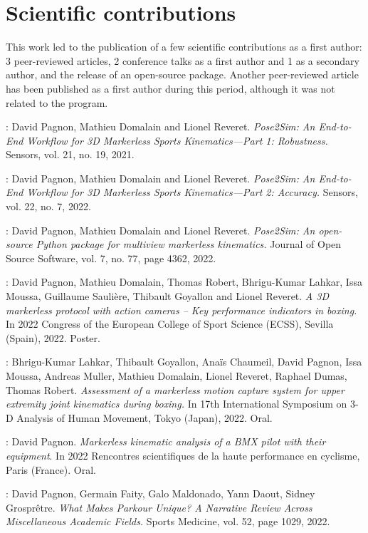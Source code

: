 \newpage
\section*{Scientific contributions}

This work led to the publication of a few scientific contributions as a first author: 3 peer-reviewed articles, 2 conference talks as a first author and 1 as a secondary author, and the release of an open-source package.
Another peer-reviewed article has been published as a first author during this period, although it was not related to the program.

\noindent\cite{Pagnon2021}: David Pagnon, Mathieu Domalain and Lionel Reveret. \textit{Pose2Sim: An
End-to-End Workflow for 3D Markerless Sports Kinematics—Part 1:
Robustness.} Sensors, vol. 21, no. 19, 2021.

\noindent\cite{Pagnon2022a}: David Pagnon, Mathieu Domalain and Lionel Reveret. \textit{Pose2Sim: An
End-to-End Workflow for 3D Markerless Sports Kinematics—Part 2:
Accuracy.} Sensors, vol. 22, no. 7, 2022.

\noindent\cite{Pagnon2022b}: David Pagnon, Mathieu Domalain and Lionel Reveret. \textit{Pose2Sim:
An open-source Python package for multiview markerless kinematics.}
Journal of Open Source Software, vol. 7, no. 77, page 4362, 2022.

\noindent\cite{Pagnon2022c}: 
David Pagnon, Mathieu Domalain, Thomas Robert, Bhrigu-Kumar Lahkar, Issa Moussa, Guillaume Saulière, Thibault Goyallon and Lionel Reveret. \textit{A 3D markerless protocol with action cameras – Key performance indicators in boxing.} In 2022 Congress of the European College of Sport Science (ECSS), Sevilla (Spain), 2022. Poster.

\noindent\cite{Lahkar2022a}: 
Bhrigu-Kumar Lahkar, Thibault Goyallon, Anaïs Chaumeil, David Pagnon, Issa Moussa, Andreas Muller, Mathieu Domalain, Lionel Reveret, Raphael Dumas, Thomas Robert. \textit{Assessment of a markerless motion capture system for upper extremity joint kinematics during boxing.} In 17th International Symposium on 3-D Analysis of Human Movement, Tokyo (Japan), 2022. Oral.


\noindent\cite{Pagnon2022e}: 
David Pagnon. \textit{Markerless kinematic analysis of a BMX pilot with their equipment}. In 2022 Rencontres scientifiques de la haute performance en cyclisme, Paris (France). Oral.

\noindent\cite{Pagnon2022d}: 
David Pagnon, Germain Faity, Galo Maldonado, Yann Daout, Sidney Grosprêtre. \textit{What Makes Parkour Unique? A Narrative Review Across Miscellaneous Academic Fields.} Sports Medicine, vol. 52, page 1029, 2022.
